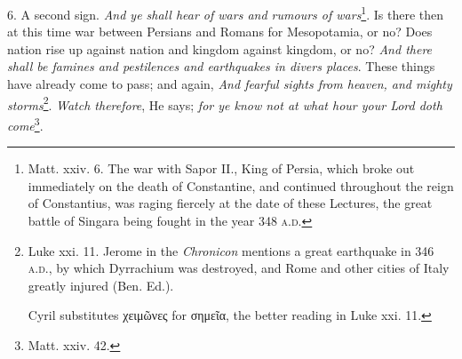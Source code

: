 6. A second sign. \emph{And ye shall hear of wars and rumours of wars}\footnote{Matt. xxiv. 6. The war with Sapor II., King of Persia, which broke out immediately on the death of Constantine, and continued throughout the reign of Constantius, was raging fiercely at the date of these Lectures, the great battle of Singara being fought in the year 348 \textsc{a.d.}}. Is there then at this time war between Persians and Romans for Mesopotamia, or no? Does nation rise up against nation and kingdom against kingdom, or no? \emph{And there shall be famines and pesti}\emph{lences and earthquakes in divers places}. These things have already come to pass; and again, \emph{And fearful sights from heaven, and mighty storms}\footnote{Luke xxi. 11. Jerome in the \emph{Chronicon} mentions a great earthquake in 346 \textsc{a.d.}, by which Dyrrachium was destroyed, and Rome and other cities of Italy greatly injured (Ben. Ed.). \par Cyril substitutes \textgreek{χειμῶνες} for \textgreek{σημεῖα}, the better reading in Luke xxi. 11.}. \emph{Watch therefore}, He says; \emph{for ye know not at what hour your Lord doth come}\footnote{Matt. xxiv. 42.}.

